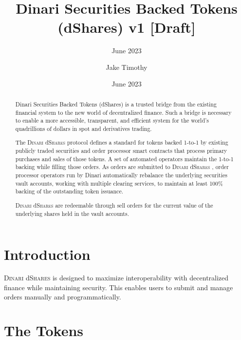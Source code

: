 \documentclass[sigconf,nonacm,prologue,table]{acmart}
\newcommand{\dshares}{\textsc{Dinari} d\textsc{Shares} }
\begin{document}
\title{Dinari Securities Backed Tokens (dShares) v1 [Draft]}
\subtitle{June 2023}
\date{June 2023}

\author{Jake Timothy}
\affiliation{}

\begin{teaserfigure}
\caption*{
    \hspace{\textwidth}
    }
\end{teaserfigure}

\renewcommand{\shortauthors}{Timothy}

\begin{abstract}

    Dinari Securities Backed Tokens (dShares) is a trusted bridge from the existing financial system to the new world of decentralized finance. Such a bridge is necessary to enable a more accessible, transparent, and efficient system for the world’s quadrillions of dollars in spot and derivatives trading. 
    
    The \dshares protocol defines a standard for tokens backed 1-to-1 by existing publicly traded securities and order processor smart contracts that process primary purchases and sales of those tokens.  A set of automated operators maintain the 1-to-1 backing while filling those orders. As orders are submitted to \dshares, order processor operators run by Dinari automatically rebalance the underlying securities vault accounts, working with multiple clearing services, to maintain at least 100\% backing of the outstanding token issuance.

    \dshares are redeemable through sell orders for the current value of the underlying shares held in the vault accounts.

\end{abstract}

\maketitle

\section{Introduction}
\label{sec:introduction}

\dshares is designed to maximize interoperability with decentralized finance while maintaining security. This enables users to submit and manage orders manually and programmatically.

\section{The Tokens} 
\label{sec:Tokens}
\end{document}
